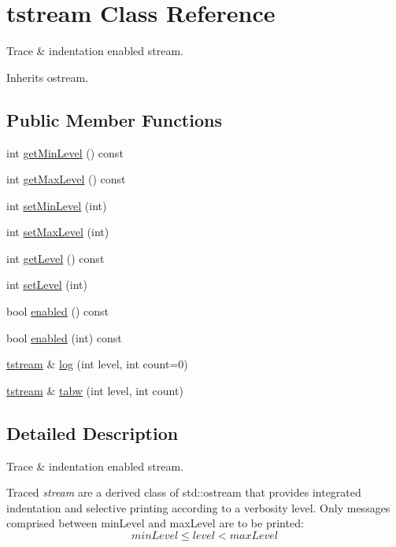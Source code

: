 \hypertarget{clasststream}{\section{tstream Class Reference}
\label{clasststream}
}


Trace \& indentation enabled stream.  




Inherits ostream.

\subsection*{Public Member Functions}
\begin{DoxyCompactItemize}
\item 
int \hyperlink{clasststream_ab2cfc71d89288db2bcbd9c1fc38bada9}{get\-Min\-Level} () const 
\item 
int \hyperlink{clasststream_aaf5c71450dcf44849df4c1036fa1669c}{get\-Max\-Level} () const 
\item 
int \hyperlink{clasststream_a0dad8cbc8fc5611b788f55c75a20a88e}{set\-Min\-Level} (int)
\item 
int \hyperlink{clasststream_a75cb778234d7b49d9e89c73e6efcd132}{set\-Max\-Level} (int)
\item 
int \hyperlink{clasststream_a3496094d6854b7b2014d19a06863f7fc}{get\-Level} () const 
\item 
int \hyperlink{clasststream_a37fa7894d7ae83674ee7cb5a69a4c4a5}{set\-Level} (int)
\item 
bool \hyperlink{clasststream_ae0a8fac43b2476e760b236743bcc0de7}{enabled} () const 
\item 
bool \hyperlink{clasststream_aa8dd9693e130a4cc3f4f61038628ba93}{enabled} (int) const 
\item 
\hyperlink{clasststream}{tstream} \& \hyperlink{clasststream_a1fe9745dc492e891a6e765e34fa082c3}{log} (int level, int count=0)
\item 
\hyperlink{clasststream}{tstream} \& \hyperlink{clasststream_a5aa7a21d7b95f1bf40e68b5b13118fd0}{tabw} (int level, int count)
\end{DoxyCompactItemize}


\subsection{Detailed Description}
Trace \& indentation enabled stream. 

Traced {\itshape stream} are a derived class of std\-::ostream that provides integrated indentation and selective printing according to a verbosity level. Only messages comprised between {\ttfamily min\-Level} and {\ttfamily max\-Level} are to be printed\-: \[ minLevel \leq level < maxLevel \]

